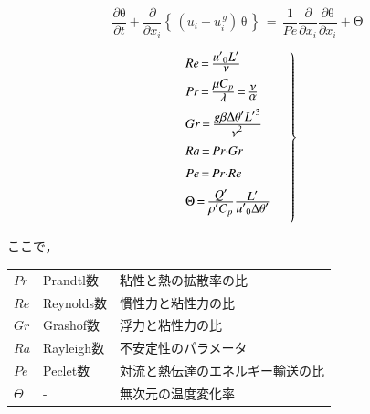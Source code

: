 \begin{equation}
\frac{\partial\mathrm{\theta}}{\partial{t}}{+}\frac{\partial}{\partial{x}_{i}} \left\{ \, \left( u_i - u_i^{\,g} \right) \, \mathrm{\theta} \, \right\}
\,{=}\,
\frac{1}{Pe}\frac{\partial}{\partial{x}_{i}}\frac{\partial\mathrm{\theta}}{\partial{x}_{i}}{+}\mathrm{\Theta}
\label{eq:thermal transport eq:ND}
\end{equation}

\begin{equation}
\left.{\begin{array}{l}
\vspace{2mm}
{{Re}\,{=}\,\frac{\displaystyle {{u}'}_{0}{L}'}{\displaystyle \mathrm{\nu}}}\\
\vspace{2mm}
{{Pr}\,{=}\,\frac{\displaystyle \mathrm{\mu}{C}_{p}}{\displaystyle \mathrm{\lambda}}\,{=}\,\frac{\displaystyle \mathrm{\nu}}{\displaystyle \mathrm{\alpha}}}\\
\vspace{2mm}
{{Gr}\,{=}\,\frac{\displaystyle {g}\mathrm{\beta}\mathrm{\Delta}{\mathrm{\theta}}'{{L}'}^{3}}{\displaystyle {\mathrm{\nu}}^{2}}}\\
\vspace{2mm}
{{Ra}\,{=}\,{Pr}\mathrm{\cdot}{Gr}}\\
\vspace{2mm}
{{Pe}\,{=}\,{Pr}\mathrm{\cdot}{Re}}\\
\vspace{2mm}
{\mathrm{\Theta}\,{=}\,\frac{\displaystyle Q^{\prime}}{\displaystyle {\mathrm{\rho}}'{C}_{p}}\frac{\displaystyle {L}'}{\displaystyle {{u}'}_{0}\mathrm{\Delta}{\mathrm{\theta}}'}}
\end{array}\quad }\right\}
\label{eq:ND definition}
\end{equation}

\noindent ここで，
\vspace{1.0cm}
\begin{center}
\begin{tabular}{lll}
$Pr$ & Prandtl数 & 粘性と熱の拡散率の比\\
$Re$ & Reynolds数 & 慣性力と粘性力の比\\
$Gr$ & Grashof数 & 浮力と粘性力の比\\
$Ra$ & Rayleigh数 & 不安定性のパラメータ\\
$Pe$ & Peclet数 & 対流と熱伝達のエネルギー輸送の比\\
$\Theta$ & - & 無次元の温度変化率\\
\end{tabular}
\end{center}
\vspace{1.0cm}

